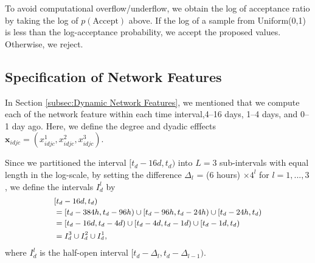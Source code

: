 \documentclass[twoside]{article}
\begin{document}
    To avoid computational overflow/underflow, we obtain the log of acceptance ratio by taking the log of $p(\mbox{Accept})$ above. If the log of a sample from Uniform(0,1) is less than the log-acceptance probability, we accept the proposed values. Otherwise, we reject.
         
    \subsection{Specification of Network Features}\label{subsec:Specification of Network Features}
    In Section \ref{subsec:Dynamic Network Features}, we mentioned that we compute each of the network feature within each time interval,4--16 days, 1--4 days, and 0--1 day ago. Here, we define the degree and dyadic efffects $\boldsymbol{x}_{idjc} = ({x}^1_{idjc}, {x}^2_{idjc}, {x}^3_{idjc})$.
    
    Since we partitioned the interval $[t_d-16d, t_d)$ into $L=3$ sub-intervals with equal length in the log-scale, by setting the difference $\Delta_l$ = (6 hours) $\times  4^l$ for $l=1,...,3$, we define the intervals $I_d^l$ by 
    \begin{equation*}
    \footnotesize
    \begin{aligned}
    &[t_d-16d,t_d) \\&=[t_d-384h, t_d-96h) \cup [t_d-96h, t_d-24h)\cup [t_d-24h, t_d) \\&= [t_d-16d, t_d-4d) \cup [t_d-4d, t_d-1d)\cup [t_d-1d, t_d)
    \\&=I_d^{3}\cup  I_d^{2}\cup I_d^{1},
    \end{aligned}
    \end{equation*}
    where $I_{d}^{l} $ is the half-open interval $[t_d-\Delta_l, t_d-\Delta_{l-1})$. 
    
\end{document}
